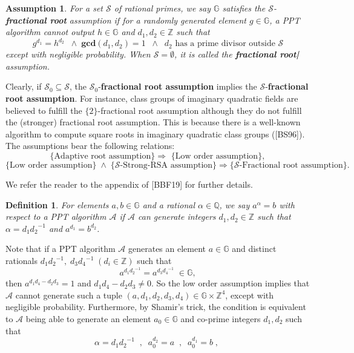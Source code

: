 \documentclass[11pt, lettersize, notitlepage, leqno, footskip=0.6cm]{article}
\newcommand{\bz}{\mathbb Z}
\newcommand{\bq}{\mathbb Q}
\newcommand{\bG}{\mathbb{G}}
\newcommand{\imp}{\Longrightarrow}
\newcommand{\mc}{\mathcal}
\newcommand{\mb}{\mathbb}
\newcommand{\mbf}{\mathbf}
\newcommand{\al}{\alpha}
\newcommand{\sub}{\subseteq}
\newcommand{\A}{\mc{A}}
\newcommand{\vs}{\vspace{-0.15cm}}
\newcommand{\noin}{\noindent}
\newcommand{\GCD}{\mbf{gcd}}
\newtheorem{Def}{Definition}[section]
\newtheorem{Ass}{Assumption}[section]
\numberwithin{equation}{section}
\begin{document}

\begin{Ass} For a set $\mc{S}$ of rational primes, we say $\mb{G}$ satisfies the $\mc{S}$-\textbf{fractional root} assumption if for a randomly generated element $g\in \mb{G}$, a PPT algorithm cannot output $h\in\mb{G}$ and $d_1,d_2\in\bz$ such that \vs $$g^{d_1} = h^{d_2}\;\;\wedge\; \GCD(d_1,d_2) = 1\;\;\wedge\;\;d_2 \text{ has a prime divisor outside } \mc{S}$$ except with negligible probability. When $\mc{S} = \emptyset$, it is called the \textbf{fractional root|} assumption. \end{Ass}

Clearly, if $\mc{S}_0\sub \mc{S}$, the $\mc{S}_0$-\textbf{fractional root assumption} implies the $\mc{S}$-\textbf{fractional root assumption}. For instance, class groups of imaginary quadratic fields are believed to fulfill the $\{2\}$-fractional root assumption although they do not fulfill the (stronger) fractional root assumption. This is because there is a well-known algorithm to compute square roots in imaginary quadratic class groups ([BS96]). The assumptions bear the following relations: $$\text{\{Adaptive root assumption\} }\imp \text{ \{Low order assumption\} } ,$$ \vspace{-0.4cm} $$\text{\{Low order assumption\}}\;\wedge\;\{\mc{S}\text{-Strong-RSA assumption\} }\imp \{\mc{S}\text{-Fractional root assumption\}}. $$

\noin We refer the reader to the appendix of [BBF19] for further details.\vspace{0.2cm}

\begin{Def} For elements $a, b\in\mb{G}$ and a rational $\al\in\bq$, we say $a^{\al} = b$ with respect to a PPT algorithm $\A$ if $\A$ can generate integers $d_1,d_2\in\bz$ such that $\al = {d_1}{d_2}^{-1}$ and  $a^{d_1} = b^{d_2}$.\end{Def}

\noin Note that if a PPT algorithm $\A$ generates an element $a\in\mb{G}$ and distinct rationals ${d_1}{d_2}^{-1},\; {d_3}{d_4}^{-1}\;(d_i\in\bz)$ such that \vs $$a^{{d_1}{d_2}^{-1}} = a^{{d_3}{d_4}^{-1}}\;\in\bG,$$ then $a^{d_1d_4-d_2d_3} = 1$ and $d_1d_4-d_2d_3\neq 0$. So the low order assumption implies that $\A$ cannot generate such a tuple $(a,d_1,d_2,d_3,d_4)\in \bG\times \bz^4$, except with negligible probability. Furthermore, by Shamir's trick, the condition is equivalent to $\A$ being able to generate an element $a_0\in\mb{G}$ and co-prime integers $d_1,d_2$ such that \vs $$\al = {d_1}{d_2}^{-1}\;\;,\;\;a_0^{d_2} =a\;\;,\;\; a_0^{d_1} =b\;,\; $$
\end{document}
